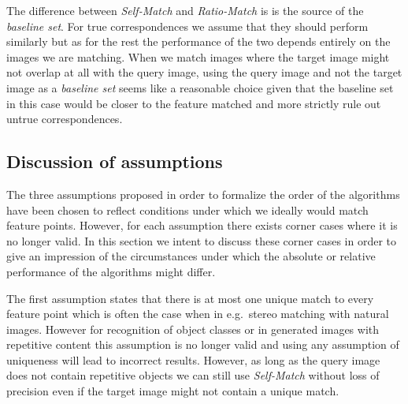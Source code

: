 \documentclass[journal]{IEEEtran}
\begin{document}
The difference between \emph{Self-Match} and \emph{Ratio-Match} is is 
the source of the \emph{baseline set}. For true correspondences we 
assume that they should perform similarly but as for the rest the 
performance of the two depends entirely on the images we are matching. 
When we match images where the target image might not overlap at all 
with the query image, using the query image and not the target image as 
a \emph{baseline set} seems like a reasonable choice given that the 
baseline set in this case would be closer to the feature matched and 
more strictly rule out untrue correspondences.


\subsection{Discussion of assumptions}
\label{ref:disc_assumptions}




The three assumptions proposed in order to formalize the order of the 
algorithms have been chosen to reflect conditions under which we ideally
would match feature points. However, for each assumption there exists 
corner cases where it is no longer valid. In this section we intent to 
discuss these corner cases in order to give an impression of the 
circumstances under which the absolute or relative performance of the 
algorithms might differ.

The first assumption states that there is at most one unique match to 
every feature point which is often the case when in e.g.\ stereo 
matching with natural images. However for recognition of object classes 
or in generated images with repetitive content this assumption is no 
longer valid and using any assumption of uniqueness will lead to 
incorrect results. However, as long as the query image does not contain 
repetitive objects we can still use \emph{Self-Match} without loss of 
precision even if the target image might not contain a unique match.
\end{document}
